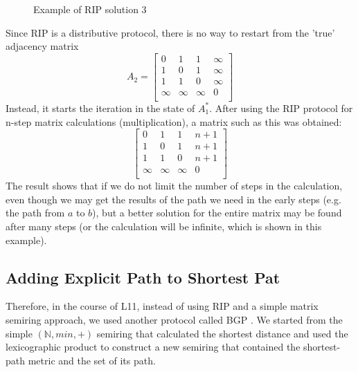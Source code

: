 \documentclass[a4paper,12pt,twoside,openright]{report}
\begin{document}
\begin{figure}[H]
\centering
{}
\label{example:rip:3}
\caption{Example of RIP solution 3}
\end{figure}
Since RIP is a distributive protocol, there is no way to restart from the 'true' adjacency matrix
\[A_2 = 
\begin{bmatrix}
    0 & 1 & 1 & \infty \\
    1 & 0 & 1 & \infty \\
    1 & 1 & 0 & \infty \\
    \infty & \infty & \infty & 0 \\
\end{bmatrix}
\]
Instead, it starts the iteration in the state of $A^*_1$.
After using the RIP protocol for n-step matrix calculations (multiplication), a matrix such as this was obtained:
\[
\begin{bmatrix}
    0 & 1 & 1 & n+1 \\
    1 & 0 & 1 & n+1 \\
    1 & 1 & 0 & n+1 \\
    \infty & \infty & \infty & 0 \\
\end{bmatrix}
\]
The result shows that if we do not limit the number of steps in the calculation, even though we may get the results of the path we need in the early steps (e.g. the path from $a$ to $b$), but a better solution for the entire matrix may be found after many steps (or the calculation will be infinite, which is shown in this example). 
\subsection{Adding Explicit Path to Shortest Pat}
Therefore, in the course of L11, instead of using RIP and a simple matrix semiring approach, we used another protocol called BGP \cite{rekhter_application_1991}. We started from the simple $(\mathbb{N},min,+)$ semiring that calculated the shortest distance and used the lexicographic product to construct a new semiring that contained the shortest-path metric and the set of its path.
\end{document}
